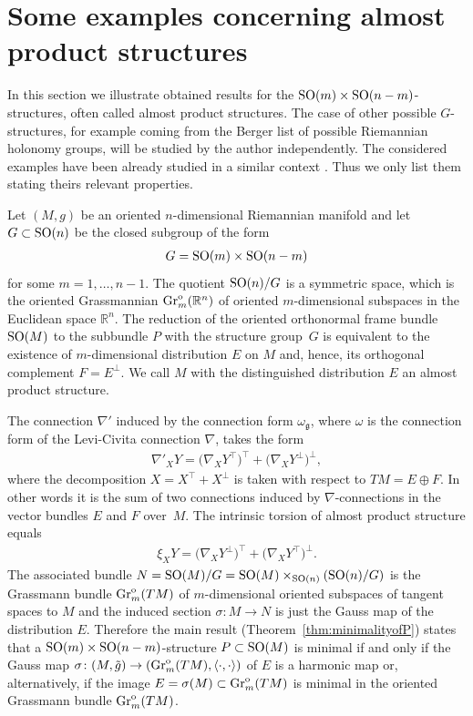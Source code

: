 \documentclass[pdftex]{sigma}
\numberwithin{equation}{section}
\newcommand{\skal}[2]{\langle #1,#2\rangle}
\begin{document}
\section{Some examples concerning almost product structures}\label{section6}

In this section we illustrate obtained results for the ${\rm SO}(m)\times {\rm SO}(n-m)$-structures, often called almost product structures. The case of other possible $G$-structures, for example coming from the Berger list of possible Riemannian holonomy groups, will be studied by the author independently. The considered examples have been already studied in a similar context \cite{ggv,gd,hl}. Thus we only list them stating theirs relevant properties.

Let $(M,g)$ be an oriented $n$-dimensional Riemannian manifold and let $G\subset {\rm SO}(n)$ be the closed subgroup of the form
\begin{gather*}
G={\rm SO}(m)\times {\rm SO}(n-m)
\end{gather*}
for some $m=1,\ldots,n-1$. The quotient ${\rm SO}(n)/G$ is a symmetric space, which is the oriented Grassmannian $\operatorname{Gr}^{\rm o}_m(\mathbb{R}^n)$ of oriented $m$-dimensional subspaces in the Euclidean space $\mathbb{R}^n$. The reduction of the oriented orthonormal frame bundle ${\rm SO}(M)$ to the subbundle $P$ with the structure group~$G$ is equivalent to the existence of $m$-dimensional distribution $E$ on $M$ and, hence, its orthogonal complement $F=E^{\bot}$. We call $M$ with the distinguished distribution $E$ an almost product structure.

The connection $\nabla'$ induced by the connection form $\omega_{\mathfrak{g}}$, where $\omega$ is the connection form of the Levi-Civita connection $\nabla$, takes the form
\begin{gather*}
\nabla '_XY=\big(\nabla_XY^{\top}\big)^{\top}+\big(\nabla_XY^{\bot}\big)^{\bot},
\end{gather*}
where the decomposition $X=X^{\top}+X^{\bot}$ is taken with respect to $TM=E\oplus F$. In other words it is the sum of two connections induced by $\nabla$-connections in the vector bundles $E$ and $F$ over~$M$. The intrinsic torsion of almost product structure equals
\begin{gather*}
\xi_XY=\big(\nabla_XY^{\bot}\big)^{\top}+\big(\nabla_XY^{\top}\big)^{\bot}.
\end{gather*}
The associated bundle $N={\rm SO}(M)/G={\rm SO}(M)\times_{{\rm SO}(n)}({\rm SO}(n)/G)$ is the Grassmann bundle $\operatorname{Gr}^{\rm o}_m(TM)$ of $m$-dimensional oriented subspaces of tangent spaces to $M$ and the induced section $\sigma\colon M\to N$ is just the Gauss map of the distribution $E$. Therefore the main result (Theorem~\ref{thm:minimalityofP}) states that a ${\rm SO}(m)\times {\rm SO}(n-m)$-structure $P\subset {\rm SO}(M)$ is minimal if and only if the Gauss map $\sigma\colon (M,\tilde{g})\to (\operatorname{Gr}^{\rm o}_m(TM),\skal{\cdot}{\cdot})$ of $E$ is a harmonic map or, alternatively, if the image $E=\sigma(M)\subset \operatorname{Gr}^{\rm o}_m(TM)$ is minimal in the oriented Grassmann bundle $\operatorname{Gr}^{\rm o}_m(TM)$.
\end{document}
